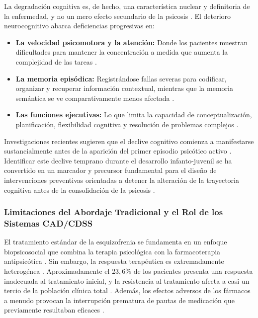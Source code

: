\documentclass[12pt,a4paper,onecolumn,oneside]{report}
\begin{document}
La degradación cognitiva es, de hecho, una característica nuclear y definitoria de la enfermedad, y no un mero efecto secundario de la psicosis \cite{montano2013esquizofrenia}. El deterioro neurocognitivo abarca deficiencias progresivas en:
\begin{itemize}
    \item \textbf{La velocidad psicomotora y la atención:} Donde los pacientes muestran dificultades para mantener la concentración a medida que aumenta la complejidad de las tareas \cite{montano2013esquizofrenia}.
    \item \textbf{La memoria episódica:} Registrándose fallas severas para codificar, organizar y recuperar información contextual, mientras que la memoria semántica se ve comparativamente menos afectada \cite{montano2013esquizofrenia}.
    \item \textbf{Las funciones ejecutivas:} Lo que limita la capacidad de conceptualización, planificación, flexibilidad cognitiva y resolución de problemas complejos \cite{montano2013esquizofrenia}.
\end{itemize}

Investigaciones recientes sugieren que el declive cognitivo comienza a manifestarse sustancialmente antes de la aparición del primer episodio psicótico activo \cite{kahn2020origins}. Identificar este declive temprano durante el desarrollo infanto-juvenil se ha convertido en un marcador y precursor fundamental para el diseño de intervenciones preventivas orientadas a detener la alteración de la trayectoria cognitiva antes de la consolidación de la psicosis \cite{kahn2020origins}.

\subsubsection{Limitaciones del Abordaje Tradicional y el Rol de los Sistemas CAD/CDSS}

El tratamiento estándar de la esquizofrenia se fundamenta en un enfoque biopsicosocial que combina la terapia psicológica con la farmacoterapia antipsicótica \cite{montano2013esquizofrenia}. Sin embargo, la respuesta terapéutica es extremadamente heterogénea \cite{saboori2025predictive}. Aproximadamente el $23,6\%$ de los pacientes presenta una respuesta inadecuada al tratamiento inicial, y la resistencia al tratamiento afecta a casi un tercio de la población clínica total \cite{saboori2025predictive}. Además, los efectos adversos de los fármacos a menudo provocan la interrupción prematura de pautas de medicación que previamente resultaban eficaces \cite{saboori2025predictive}.
\end{document}
